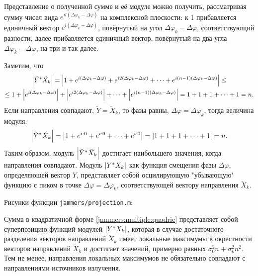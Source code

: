 Представление о полученной сумме и её модуле можно получить, рассматривая сумму чисел вида $e^{i l (\Delta \varphi_k - \Delta \varphi )}$ на комплексной
плоскости: к 1 прибавляется единичный вектор $e^{i (\Delta \varphi_k - \Delta \varphi )}$, повёрнутый на угол $\Delta \varphi_k - \Delta \varphi$, соответствующий разности,
далее прибавляется единичный вектор, повёрнутый на два угла $\Delta \varphi_k - \Delta \varphi$, на три и так далее.

Заметим, что
\begin{multline*}
    \left | \breve{Y}^* \breve{X}_k \right |
    = \left | 1 + e^{i (\Delta \varphi_k - \Delta \varphi )} + e^{i 2 (\Delta \varphi_k - \Delta \varphi )} + \dots + e^{i (n-1) (\Delta \varphi_k - \Delta \varphi )} \right | \le \\
    \le 1 + \left | e^{i (\Delta \varphi_k - \Delta \varphi )} \right | + \left | e^{i 2 (\Delta \varphi_k - \Delta \varphi )} \right | + \dots + \left | e^{i (n-1) (\Delta \varphi_k - \Delta \varphi )} \right |
    = 1 + 1 + 1 + \dots + 1
    = n .
\end{multline*}
Если направления совпадают, $\breve{Y} = \breve{X}_k$, то фазы равны, $\Delta \varphi = \Delta \varphi_k$, тогда величина модуля:
\[
    \left | \breve{Y}^* \breve{X}_k \right |
    = \left | 1 + e^{i \cdot 0} + e^{i \cdot 0} + \dots + e^{i \cdot 0} \right |
    = \left | 1 + 1 + 1 + \dots + 1 \right |
    = n .
\]
Таким образом, модуль $\left | \breve{Y}^* \breve{X}_k \right |$ достигает наибольшего значения, когда направления совпадают. Модуль $\left | Y^* X_k \right |$ как функция смещения фазы
$\Delta \varphi$, определяющей вектор $Y$, представляет собой осцилирующую "убывающую"{} функцию с пиком в точке $\Delta \varphi = \Delta \varphi_k$, соответствующей вектору
направления $\breve{X}_k$.

Рисунки функции \texttt{jammers/projection.m}:
\begin{Matlab}
\end{Matlab}

Сумма в квадратичной форме \eqref{jammers:multiple:quadric} представляет собой суперпозицию функций-модулей $\left | Y^* X_k \right |$, которая в случае достаточного разделения векторов
направлений $\breve{X}_k$ имеет локальные максимумы в окрестности векторов направлений $\breve{X}_k$ и достигает значений, примерно равных $\sigma_0^2 n + \sigma_k^2 n^2$. Тем не менее,
направления локальных максимумов не обязательно совпадают с направлениями источников излучения.

